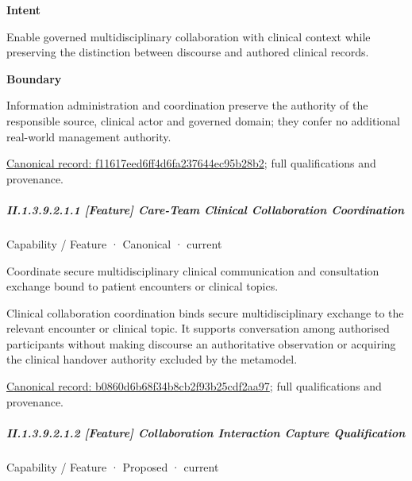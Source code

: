 \textbf{Intent}



Enable governed multidisciplinary collaboration with clinical context while preserving the distinction between discourse and authored clinical records.



\textbf{Boundary}



Information administration and coordination preserve the authority of the responsible source, clinical actor and governed domain; they confer no additional real-world management authority.


{\footnotesize \href{../../../../continuum/strategy/capability/f11617eed6ff4d6fa237644ec95b28b2.md}{Canonical record: f11617eed6ff4d6fa237644ec95b28b2}; full qualifications and provenance.}\par
\subparagraph*{II.1.3.9.2.1.1 [Feature] Care-Team Clinical Collaboration Coordination}
\label{navigation:II.1.3.9.2.1.1}

\label{element:b0860d6b68f34b8cb2f93b25cdf2aa97}
{\small Capability / Feature · Canonical · current}\par

Coordinate secure multidisciplinary clinical communication and consultation exchange bound to patient encounters or clinical topics.



Clinical collaboration coordination binds secure multidisciplinary exchange to the relevant encounter or clinical topic. It supports conversation among authorised participants without making discourse an authoritative observation or acquiring the clinical handover authority excluded by the metamodel.


{\footnotesize \href{../../../../continuum/strategy/capability/feature/b0860d6b68f34b8cb2f93b25cdf2aa97.md}{Canonical record: b0860d6b68f34b8cb2f93b25cdf2aa97}; full qualifications and provenance.}\par
\subparagraph*{II.1.3.9.2.1.2 [Feature] Collaboration Interaction Capture Qualification}
\label{navigation:II.1.3.9.2.1.2}

\label{element:8e2a760f15bd454c8aba1526ee69740c}
{\small Capability / Feature · Proposed · current}\par

